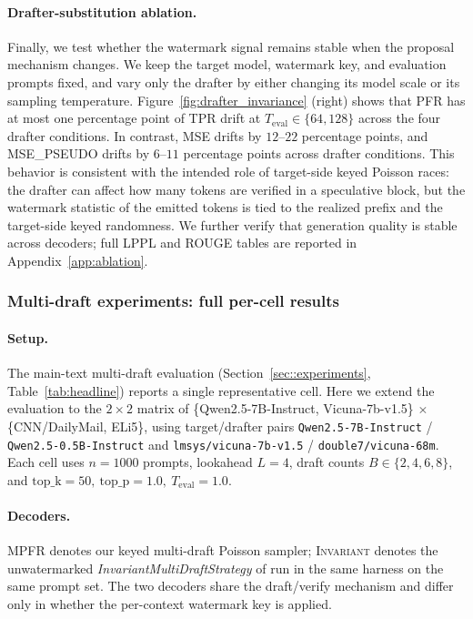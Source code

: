 \paragraph{Drafter-substitution ablation.}
Finally, we test whether the watermark signal remains stable when the proposal
mechanism changes. We keep the target model, watermark key, and evaluation prompts
fixed, and vary only the drafter by either changing its model scale or its sampling
temperature. Figure~\ref{fig:drafter_invariance} (right) shows that \textsc{PFR}
has at most one percentage point of TPR drift at
$T_{\mathrm{eval}}\in\{64,128\}$ across the four drafter conditions. In contrast,
\textsc{MSE} drifts by $12$--$22$ percentage points, and \textsc{MSE\_PSEUDO}
drifts by $6$--$11$ percentage points across drafter conditions. This behavior is
consistent with the intended role of target-side keyed Poisson races: the drafter can
affect how many tokens are verified in a speculative block, but the watermark
statistic of the emitted tokens is tied to the realized prefix and the target-side
keyed randomness. We further verify that generation quality is stable across
decoders; full LPPL and ROUGE tables are reported in Appendix~\ref{app:ablation}.



\appendix
\subsubsection{Multi-draft experiments: full per-cell results}
\label{sec:multi_draft}

\paragraph{Setup.}
The main-text multi-draft evaluation
(Section~\ref{sec::experiments}, Table~\ref{tab:headline}) reports a
single representative cell.  Here we extend the evaluation to the
$2{\times}2$ matrix of \{Qwen2.5-7B-Instruct, Vicuna-7b-v1.5\}
$\times$ \{CNN/DailyMail, ELi5\}, using target/drafter pairs
\texttt{Qwen2.5-7B-Instruct} / \texttt{Qwen2.5-0.5B-Instruct} and
\texttt{lmsys/vicuna-7b-v1.5} / \texttt{double7/vicuna-68m}.  Each cell
uses $n{=}1000$ prompts, lookahead $L{=}4$, draft counts
$B\in\{2,4,6,8\}$, and $\mathrm{top\_k}=50,\ \mathrm{top\_p}=1.0,\
T_{\mathrm{eval}}=1.0$.

\paragraph{Decoders.}
\textsc{MPFR} denotes our keyed multi-draft Poisson sampler;
\textsc{Invariant} denotes the unwatermarked
\emph{InvariantMultiDraftStrategy} of \citet{rowan2025list} run in the
same harness on the same prompt set.  The two decoders share the
draft/verify mechanism and differ only in whether the per-context
watermark key is applied.

